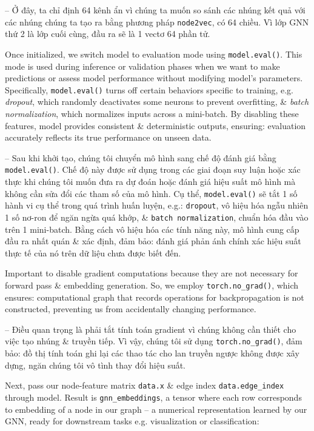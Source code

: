 \documentclass{article}
\begin{document}
\begin{itemize}
\begin{itemize}
\begin{itemize}
\begin{itemize}
               -- Ở đây, ta chỉ định 64 kênh ẩn vì chúng ta muốn so sánh các nhúng kết quả với các nhúng chúng ta tạo ra bằng phương pháp {\tt node2vec}, có 64 chiều. Vì lớp GNN thứ 2 là lớp cuối cùng, đầu ra sẽ là 1 vectơ 64 phần tử.

               Once initialized, we switch model to evaluation mode using {\tt model.eval()}. This mode is used during inference or validation phases when we want to make predictions or assess model performance without modifying model's parameters. Specifically, {\tt model.eval()} turns off certain behaviors specific to training, e.g. {\it dropout}, which randomly deactivates some neurons to prevent overfitting, \& {\it batch normalization}, which normalizes inputs across a mini-batch. By disabling these features, model provides consistent \& deterministic outputs, ensuring: evaluation accurately reflects its true performance on unseen data.

               -- Sau khi khởi tạo, chúng tôi chuyển mô hình sang chế độ đánh giá bằng {\tt model.eval()}. Chế độ này được sử dụng trong các giai đoạn suy luận hoặc xác thực khi chúng tôi muốn đưa ra dự đoán hoặc đánh giá hiệu suất mô hình mà không cần sửa đổi các tham số của mô hình. Cụ thể, {\tt model.eval()} sẽ tắt 1 số hành vi cụ thể trong quá trình huấn luyện, e.g.: {\tt dropout}, vô hiệu hóa ngẫu nhiên 1 số nơ-ron để ngăn ngừa quá khớp, \& {\tt batch normalization}, chuẩn hóa đầu vào trên 1 mini-batch. Bằng cách vô hiệu hóa các tính năng này, mô hình cung cấp đầu ra nhất quán \& xác định, đảm bảo: đánh giá phản ánh chính xác hiệu suất thực tế của nó trên dữ liệu chưa được biết đến.

               Important to disable gradient computations because they are not necessary for forward pass \& embedding generation. So, we employ \verb|torch.no_grad()|, which ensures: computational graph that records operations for backpropagation is not constructed, preventing us from accidentally changing performance.

               -- Điều quan trọng là phải tắt tính toán gradient vì chúng không cần thiết cho việc tạo nhúng \& truyền tiếp. Vì vậy, chúng tôi sử dụng \verb|torch.no_grad()|, đảm bảo: đồ thị tính toán ghi lại các thao tác cho lan truyền ngược không được xây dựng, ngăn chúng tôi vô tình thay đổi hiệu suất.

               Next, pass our node-feature matrix {\tt data.x} \& edge index \verb|data.edge_index| through model. Result is \verb|gnn_embeddings|, a tensor where each row corresponds to embedding of a node in our graph -- a numerical representation learned by our GNN, ready for downstream tasks e.g. visualization or classification:


\end{itemize}
\end{itemize}
\end{itemize}
\end{itemize}
\end{document}
